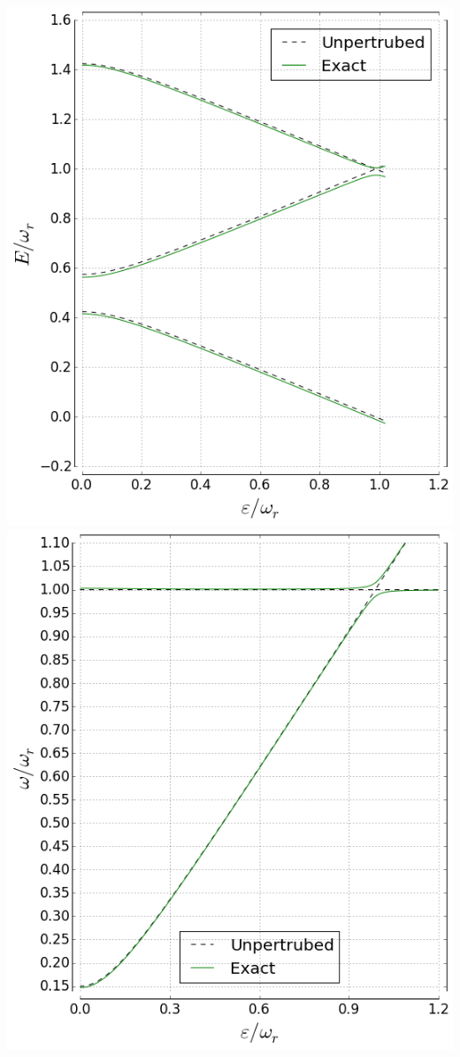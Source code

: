 \documentclass[aspectratio=169, 13pt]{beamer}
\begin{document}
\begin{frame}[c]\frametitle{\secname}\framesubtitle{\subsecname}
\begin{columns}[c]
\includegraphics[height=0.85\textheight]{Rabi_levels}
\includegraphics[height=0.85\textheight]{Rabi_spectrum}
\end{columns}
\end{frame}
\end{document}

